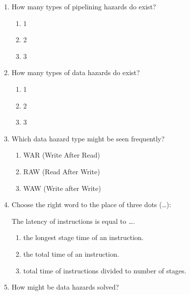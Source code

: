 \documentclass[paper=8.5in:11in]{scrartcl}
\begin{document}

\begin{enumerate}

\item How many types of pipelining hazards do exist?

\begin{enumerate}[label=\alph*)]

\item 1
\item 2
\item 3

\end{enumerate}

\item How many types of data hazards do exist?

\begin{enumerate}[label=\alph*)]

\item 1
\item 2
\item 3

\end{enumerate}

\item Which data hazard type might be seen frequently?

\begin{enumerate}[label=\alph*)]

\item WAR (Write After Read)
\item RAW (Read After Write)
\item WAW (Write after Write)

\end{enumerate}

\item Choose the right word to the place of three dots (\ldots):

The latency of instructions is equal to \ldots.
\begin{enumerate}[label=\alph*)]

\item the longest stage time of an instruction.
\item the total time of an instruction.
\item total time of instructions divided to number of stages.

\end{enumerate}

\item How might be data hazards solved?


\end{enumerate}
\end{document}
